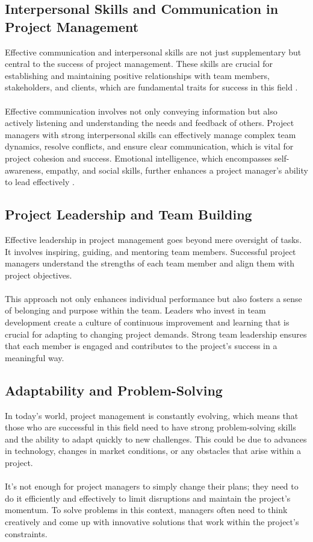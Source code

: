 \documentclass{article}
\begin{document}
\subsection{Interpersonal Skills and Communication in Project Management}
Effective communication and interpersonal skills are not just supplementary but central to the success of project management. These skills are crucial for establishing and maintaining positive relationships with team members, stakeholders, and clients, which are fundamental traits for success in this field \cite{Interpersonal_skills}.\\\\
Effective communication involves not only conveying information but also actively listening and understanding the needs and feedback of others. Project managers with strong interpersonal skills can effectively manage complex team dynamics, resolve conflicts, and ensure clear communication, which is vital for project cohesion and success. Emotional intelligence, which encompasses self-awareness, empathy, and social skills, further enhances a project manager's ability to lead effectively \cite{Warner_Mark}.\\

\subsection{Project Leadership and Team Building}
Effective leadership in project management goes beyond mere oversight of tasks. It involves inspiring, guiding, and mentoring team members. Successful project managers understand the strengths of each team member and align them with project objectives.\\
\\This approach not only enhances individual performance but also fosters a sense of belonging and purpose within the team. Leaders who invest in team development create a culture of continuous improvement and learning that is crucial for adapting to changing project demands. Strong team leadership ensures that each member is engaged and contributes to the project's success in a meaningful way\cite{Project_Management}.


\subsection{Adaptability and Problem-Solving}
In today's world, project management is constantly evolving, which means that those who are successful in this field need to have strong problem-solving skills and the ability to adapt quickly to new challenges. This could be due to advances in technology, changes in market conditions, or any obstacles that arise within a project. \\\\It's not enough for project managers to simply change their plans; they need to do it efficiently and effectively to limit disruptions and maintain the project's momentum. To solve problems in this context, managers often need to think creatively and come up with innovative solutions that work within the project's constraints.\cite{Project_Management_Leadership}
\end{document}
